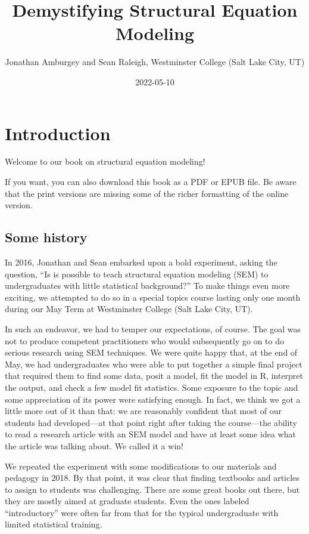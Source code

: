 \documentclass[
]{book}
\title{Demystifying Structural Equation Modeling}
\author{Jonathan Amburgey and Sean Raleigh, Westminster College (Salt Lake City, UT)}
\date{2022-05-10}
\begin{document}
\maketitle

{
\setcounter{tocdepth}{1}
\tableofcontents
}
\hypertarget{intro}{%
\chapter*{Introduction}\label{intro}}

Welcome to our book on structural equation modeling!

If you want, you can also download this book as a PDF or EPUB file. Be aware that the print versions are missing some of the richer formatting of the online version.

\hypertarget{intro-history}{%
\section*{Some history}\label{intro-history}}

In 2016, Jonathan and Sean embarked upon a bold experiment, asking the question, ``Is is possible to teach structural equation modeling (SEM) to undergraduates with little statistical background?'' To make things even more exciting, we attempted to do so in a special topics course lasting only one month during our May Term at Westminster College (Salt Lake City, UT).

In such an endeavor, we had to temper our expectations, of course. The goal was not to produce competent practitioners who would subsequently go on to do serious research using SEM techniques. We were quite happy that, at the end of May, we had undergraduates who were able to put together a simple final project that required them to find some data, posit a model, fit the model in R, interpret the output, and check a few model fit statistics. Some exposure to the topic and some appreciation of its power were satisfying enough. In fact, we think we got a little more out of it than that: we are reasonably confident that most of our students had developed---at that point right after taking the course---the ability to read a research article with an SEM model and have at least some idea what the article was talking about. We called it a win!

We repeated the experiment with some modifications to our materials and pedagogy in 2018. By that point, it was clear that finding textbooks and articles to assign to students was challenging. There are some great books out there, but they are mostly aimed at graduate students. Even the ones labeled ``introductory'' were often far from that for the typical undergraduate with limited statistical training.
\end{document}
